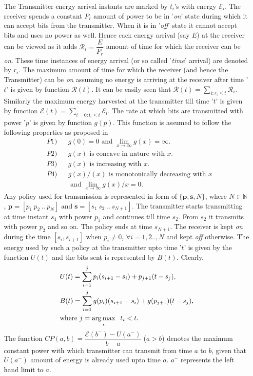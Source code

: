 The Transmitter energy arrival instants are marked by $t_i$'s with energy $\mathcal{E}_i$. %
 The receiver spends a constant $P_{r}$ amount of power to be in '\textit{on}' state during which it can accept bits from the transmitter. When it is in '\textit{off}' state it cannot accept bits and uses no power as well. Hence each energy arrival (say $E$) at the receiver can be viewed as it adds $\mathcal{R}_i=\dfrac{E}{P_{r}}$ amount of time for which the receiver can be \textit{on}. These time instances of energy arrival (or so called '\textit{time}' arrival) are denoted by $r_i$. The maximum amount of time for which the receiver (and hence the Transmitter) can be \textit{on} assuming no energy is arriving at the receiver after time '$t$' is given by function $\mathcal{R}(t)$. It can be easily seen that $\mathcal{R}(t)=\underset{i:r_i\le t}{\sum}\mathcal{R}_i$. Similarly the maximum energy harvested at the transmitter till time '$t$' is given by function $\mathcal{E}(t)=\underset{i=0:t_i\le t}{\sum}\mathcal{E}_i$. The rate at which bits are transmitted with power '$p$' is given by function $g(p)$. This function is assumed to follow the following properties as proposed in \cite{Yang} 
\begin{align}
&P1) &&g(0)=0\text{ and }\lim_{x\rightarrow \infty} g(x)= \infty.\label{property_0_infty}
\\
&P2) &&g(x)\text{ is concave in nature with } x.\label{property_concave}
\\
&P3) &&g(x)\text{ is increasing with } x.\label{property_increasing}
\\ 
&P4) &&g(x)/(x) \text{ is monotonically decreasing with } x\nonumber
\\
&    &&\text{ and } \lim_{x\rightarrow \infty} g(x)/x= 0.\label{property_decreasing}
\end{align}
Any policy used for transmission is represented in form of $\{\textbf{p},\textbf{s},N\}$, where $N\in \mathbb{N}$, $\textbf{p}=[p_1\ p_2\ ..\ p_N]$ and $\textbf{s}=[s_1\ s_2\ ..\ s_{N+1}]$. The transmitter starts transmitting at time instant $s_1$ with power $p_1$ and continues till time $s_2$. From $s_2$ it transmits with power $p_2$ and so on. The policy ends at time $s_{N+1}$. The receiver is kept \textit{on} during the time $[s_i,s_{i+1}]$ when $p_i\ne 0$, $\forall i=1,2..,N$ and kept \textit{off} otherwise. The energy used by such a policy at the transmitter upto time '$t$' is given by the function $U(t)$ and the bits sent is represented by $B(t)$. Clearly,
\begin{align}
&U(t)=\sum_{i=1}^{j} p_i(s_{i+1}-s_i)+p_{j+1}(t-s_j) ,
\\
&B(t)=\sum_{i=1}^{j} g(p_i)(s_{i+1}-s_i)+g(p_{j+1})(t-s_j),
\\
&\text{where }j=\operatorname*{arg\,max}_{i} \hspace{2mm}t_i<t.\nonumber
\end{align}
The function $CP(a,b)=\dfrac{\mathcal{E}(b^- )-U(a^- )}{b-a}$ ($a>b$) denotes the maximum constant power with which transmitter can transmit from time $a$ to $b$, given that $U(a^- )$ amount of energy is already used upto time $a$. $a^-$ represents the left hand limit to $a$.

